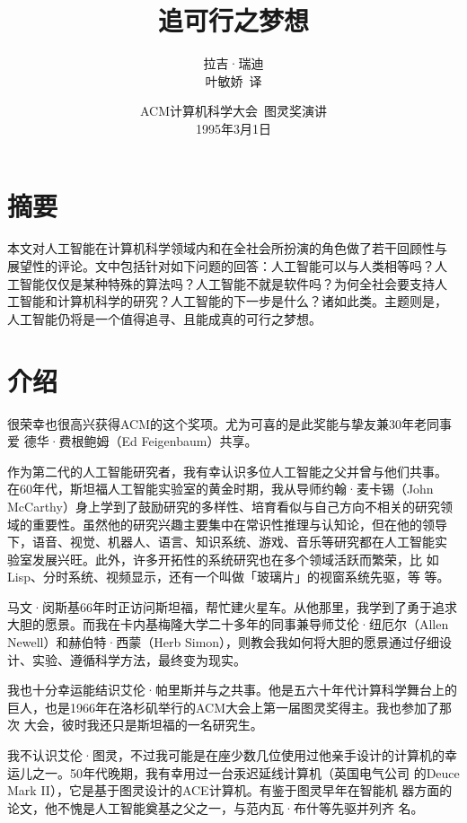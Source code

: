 \documentclass[12pt,a4paper]{article}
\begin{document}
\title{\whei 追可行之梦想}
\author{\kai 拉吉·瑞迪\\
  \kai 叶敏娇~译}
\date{\kai ACM计算机科学大会~图灵奖演讲\\
  1995年3月1日}

\maketitle

\section{摘要}
本文对人工智能在计算机科学领域内和在全社会所扮演的角色做了若干回顾性与
展望性的评论。文中包括针对如下问题的回答：人工智能可以与人类相等吗？人
工智能仅仅是某种特殊的算法吗？人工智能不就是软件吗？为何全社会要支持人
工智能和计算机科学的研究？人工智能的下一步是什么？诸如此类。主题则是，
人工智能仍将是一个值得追寻、且能成真的可行之梦想。

\section{介绍}
很荣幸也很高兴获得ACM的这个奖项。尤为可喜的是此奖能与挚友兼30年老同事爱
德华·费根鲍姆（Ed Feigenbaum）共享。

作为第二代的人工智能研究者，我有幸认识多位人工智能之父并曾与他们共事。
在60年代，斯坦福人工智能实验室的黄金时期，我从导师约翰·麦卡锡（John
McCarthy）身上学到了鼓励研究的多样性、培育看似与自己方向不相关的研究领
域的重要性。虽然他的研究兴趣主要集中在常识性推理与认知论，但在他的领导
下，语音、视觉、机器人、语言、知识系统、游戏、音乐等研究都在人工智能实
验室发展兴旺。此外，许多开拓性的系统研究也在多个领域活跃而繁荣，比
如Lisp、分时系统、视频显示，还有一个叫做「玻璃片」的视窗系统先驱，等
等。

马文·闵斯基66年时正访问斯坦福，帮忙建火星车。从他那里，我学到了勇于追求
大胆的愿景。而我在卡内基梅隆大学二十多年的同事兼导师艾伦·纽厄尔（Allen
Newell）和赫伯特·西蒙（Herb Simon），则教会我如何将大胆的愿景通过仔细设
计、实验、遵循科学方法，最终变为现实。

我也十分幸运能结识艾伦·帕里斯并与之共事。他是五六十年代计算科学舞台上的
巨人，也是1966年在洛杉矶举行的ACM大会上第一届图灵奖得主。我也参加了那次
大会，彼时我还只是斯坦福的一名研究生。

我不认识艾伦·图灵，不过我可能是在座少数几位使用过他亲手设计的计算机的幸
运儿之一。50年代晚期，我有幸用过一台汞迟延线计算机（英国电气公司
的Deuce Mark II），它是基于图灵设计的ACE计算机。有鉴于图灵早年在智能机
器方面的论文，他不愧是人工智能奠基之父之一，与范内瓦·布什等先驱并列齐
名。
\end{document}
